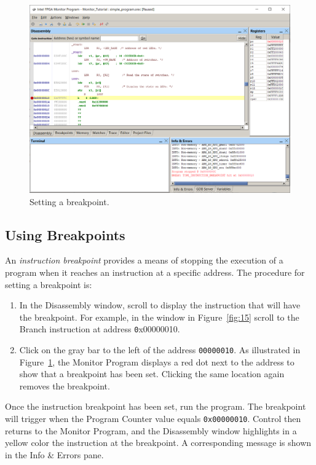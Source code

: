 \documentclass[11pt, twoside, pdftex]{article}
\begin{document}
\begin{figure}[H]
   \begin{center}
      \includegraphics[scale=0.6]{screenshots/figure17.png}
   \end{center}
   \caption{Setting a breakpoint.}
	 \label{fig:17}
\end{figure}

\subsection{Using Breakpoints}
\label{sec:3.6}

An {\it instruction breakpoint} provides a means of stopping the
execution of a program when it reaches an instruction at a
specific address.  The procedure for setting a breakpoint is:

\begin{enumerate}
\item In the Disassembly window, scroll to display the instruction that will have the breakpoint. For example, 
in the window in Figure~\ref{fig:15} scroll
to the Branch instruction at address {\texttt 0x00000010}. 

\item Click on the gray bar to the left of the address
\texttt{00000010}. As illustrated in Figure~\ref{fig:17},
the Monitor Program displays a red dot next to the address
to show that a breakpoint has been set. 
Clicking the same location again removes the breakpoint.
\end{enumerate}

Once the instruction breakpoint has been set, run the program.
The breakpoint will trigger when the Program Counter value equals \texttt{0x00000010}. Control then returns to the Monitor Program,
and the Disassembly window highlights in a yellow color the
instruction at the breakpoint. A corresponding message is shown
in the {\sf Info \& Errors} pane.
\end{document}
